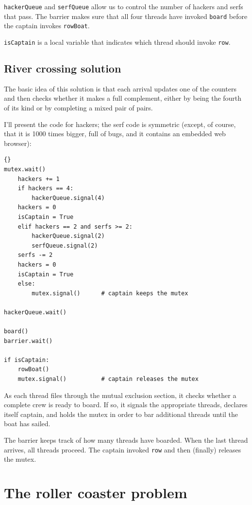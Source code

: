 \documentclass{book}
\newcommand{\clearemptydoublepage}{\newpage\cleardoublepage}
\begin{document}
{\tt hackerQueue} and {\tt serfQueue} allow us to control the number
of hackers and serfs that pass.  The barrier
makes sure that all four threads have invoked
{\tt board} before the captain invokes {\tt rowBoat}.

{\tt isCaptain} is a local variable that
indicates which thread should invoke {\tt row}.

\clearemptydoublepage
\subsection {River crossing solution}

The basic idea of this solution is that each arrival updates
one of the counters and then checks whether it makes a
full complement, either by being the fourth of its kind or
by completing a mixed pair of pairs.

I'll present the code for hackers; the serf code is
symmetric (except, of course, that it is 1000 times bigger,
full of bugs, and it contains an embedded web browser):

\begin{lstlisting}[caption={River crossing solution}]{}
mutex.wait()
    hackers += 1
    if hackers == 4:
        hackerQueue.signal(4)                
	hackers = 0
	isCaptain = True
    elif hackers == 2 and serfs >= 2:
        hackerQueue.signal(2)                
        serfQueue.signal(2)                  
	serfs -= 2
	hackers = 0
	isCaptain = True
    else:
        mutex.signal()      # captain keeps the mutex

hackerQueue.wait()           

board()
barrier.wait()            

if isCaptain:
    rowBoat()
    mutex.signal()          # captain releases the mutex
\end{lstlisting}

As each thread files through the mutual exclusion section, it
checks whether a complete crew is ready to board.  If so, it
signals the appropriate threads, declares itself captain, and
holds the mutex in order to bar additional threads until the
boat has sailed.

The barrier keeps track of how many threads have boarded.
When the last thread arrives, all threads proceed.
The captain invoked {\tt row} and then (finally) releases the mutex.


\clearemptydoublepage
\section{The roller coaster problem}
\end{document}

